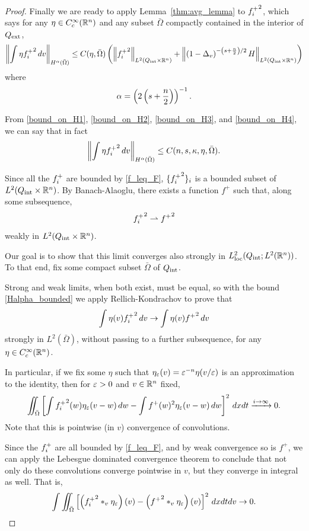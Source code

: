 \begin{proof}
Finally we are ready to apply Lemma~\ref{thm:avg_lemma} to ${f_i^+}^2$, which says for any $\eta \in C_c^\infty(\mathbb{R}^n)$ and any subset $\bar{\Omega}$ compactly contained in the interior of ${Q_\textrm{ext}}$,
\[ \left\lVert\int \eta {f_i^+}^2 \,dv\right\rVert_{H^\alpha(\bar{\Omega})} \leq C(\eta, \bar{\Omega}) \left( \left\lVert{f_i^+}^2\right\rVert_{L^2({Q_\textrm{int}} \times \mathbb{R}^n)} + \left\lVert\left( 1-\Delta_v \right)^{-\left( s + \frac{n}{2} \right)/2} H\right\rVert_{L^2({Q_\textrm{int}}\times\mathbb{R}^n)} \right) \]
where
\[ \alpha = \left( 2\left( s+\frac{n}{2} \right) \right)^{-1}. \]

From \eqref{bound_on_H1}, \eqref{bound_on_H2}, \eqref{bound_on_H3}, and \eqref{bound_on_H4}, we can say that in fact
\begin{equation}\label{Halpha_bounded} 
\left\lVert\int \eta {f_i^+}^2 \,dv\right\rVert_{H^\alpha(\bar{\Omega})} \leq C(n,s,\kappa,\eta,\bar{\Omega}). 
\end{equation}


Since all the ${f_i^+}$ are bounded by \eqref{f_leq_F}, $\{{f_i^+}^2\}_i$ is a bounded subset of $L^2({Q_\textrm{int}} \times \mathbb{R}^n)$.  By Banach-Alaoglu, there exists a function $f^+$ such that, along some subsequence, 
\[ {f_i^+}^2 \rightharpoonup {f^+}^2 \]
weakly in $L^2({Q_\textrm{int}} \times \mathbb{R}^n)$.  

Our goal is to show that this limit converges also strongly in $L^2_{\text{loc}}({Q_\textrm{int}}; L^2(\mathbb{R}^n))$.  To that end, fix some compact subset $\bar{\Omega}$ of ${Q_\textrm{int}}$.  

Strong and weak limits, when both exist, must be equal, so with the bound \eqref{Halpha_bounded} we apply Rellich-Kondrachov to prove that
\[ \int \eta(v) {f_i^+}^2 \,dv \to \int \eta(v) {f^+}^2 \,dv \]
strongly in $L^2(\bar{\Omega})$, without passing to a further subsequence, for any $\eta \in C_c^\infty(\mathbb{R}^n)$.  

In particular, if we fix some $\eta$ such that $\eta_\varepsilon(v) = \varepsilon^{-n} \eta(v/\varepsilon)$ is an approximation to the identity, then for $\varepsilon > 0$ and $v \in \mathbb{R}^n$ fixed,
\[ \iint_{\bar{\Omega}} \left[ \int {f_i^+}^2(w) \eta_\varepsilon(v-w) \,dw - \int {f^+}(w)^2 \eta_\varepsilon(v-w) \,dw \right]^2 \,dxdt \xrightarrow{i\to\infty} 0. \]
Note that this is pointwise (in $v$) convergence of convolutions.

Since the ${f_i^+}$ are all bounded by \eqref{f_leq_F}, and by weak convergence so is ${f^+}$, we can apply the Lebesgue dominated convergence theorem to conclude that not only do these convolutions converge pointwise in $v$, but they converge in integral as well.  That is,
\begin{equation}\label{convergence_of_convolutions}
\int \iint_{\bar{\Omega}} \left[ \left( {f_i^+}^2 \ast_v \eta_\varepsilon \right)(v) - \left( {f^+}^2 \ast_v \eta_\varepsilon \right)(v) \right]^2 \,dxdtdv \to 0. 
\end{equation}


\end{proof}
